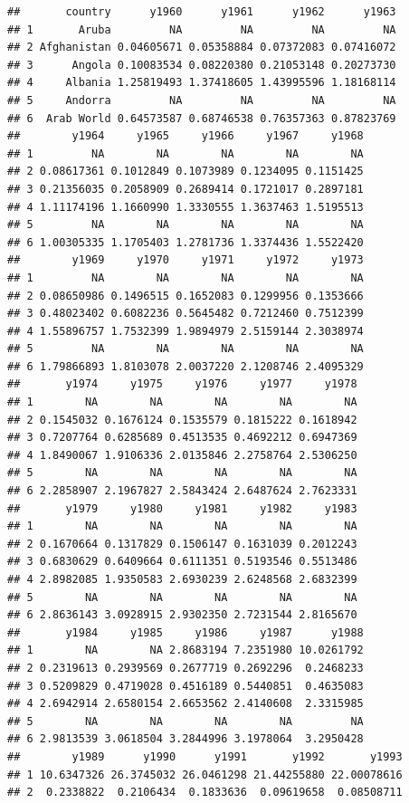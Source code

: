 \documentclass[
]{book}
\begin{document}
\begin{verbatim}
##       country      y1960      y1961      y1962      y1963
## 1       Aruba         NA         NA         NA         NA
## 2 Afghanistan 0.04605671 0.05358884 0.07372083 0.07416072
## 3      Angola 0.10083534 0.08220380 0.21053148 0.20273730
## 4     Albania 1.25819493 1.37418605 1.43995596 1.18168114
## 5     Andorra         NA         NA         NA         NA
## 6  Arab World 0.64573587 0.68746538 0.76357363 0.87823769
##        y1964     y1965     y1966     y1967     y1968
## 1         NA        NA        NA        NA        NA
## 2 0.08617361 0.1012849 0.1073989 0.1234095 0.1151425
## 3 0.21356035 0.2058909 0.2689414 0.1721017 0.2897181
## 4 1.11174196 1.1660990 1.3330555 1.3637463 1.5195513
## 5         NA        NA        NA        NA        NA
## 6 1.00305335 1.1705403 1.2781736 1.3374436 1.5522420
##        y1969     y1970     y1971     y1972     y1973
## 1         NA        NA        NA        NA        NA
## 2 0.08650986 0.1496515 0.1652083 0.1299956 0.1353666
## 3 0.48023402 0.6082236 0.5645482 0.7212460 0.7512399
## 4 1.55896757 1.7532399 1.9894979 2.5159144 2.3038974
## 5         NA        NA        NA        NA        NA
## 6 1.79866893 1.8103078 2.0037220 2.1208746 2.4095329
##       y1974     y1975     y1976     y1977     y1978
## 1        NA        NA        NA        NA        NA
## 2 0.1545032 0.1676124 0.1535579 0.1815222 0.1618942
## 3 0.7207764 0.6285689 0.4513535 0.4692212 0.6947369
## 4 1.8490067 1.9106336 2.0135846 2.2758764 2.5306250
## 5        NA        NA        NA        NA        NA
## 6 2.2858907 2.1967827 2.5843424 2.6487624 2.7623331
##       y1979     y1980     y1981     y1982     y1983
## 1        NA        NA        NA        NA        NA
## 2 0.1670664 0.1317829 0.1506147 0.1631039 0.2012243
## 3 0.6830629 0.6409664 0.6111351 0.5193546 0.5513486
## 4 2.8982085 1.9350583 2.6930239 2.6248568 2.6832399
## 5        NA        NA        NA        NA        NA
## 6 2.8636143 3.0928915 2.9302350 2.7231544 2.8165670
##       y1984     y1985     y1986     y1987      y1988
## 1        NA        NA 2.8683194 7.2351980 10.0261792
## 2 0.2319613 0.2939569 0.2677719 0.2692296  0.2468233
## 3 0.5209829 0.4719028 0.4516189 0.5440851  0.4635083
## 4 2.6942914 2.6580154 2.6653562 2.4140608  2.3315985
## 5        NA        NA        NA        NA         NA
## 6 2.9813539 3.0618504 3.2844996 3.1978064  3.2950428
##        y1989      y1990      y1991       y1992       y1993
## 1 10.6347326 26.3745032 26.0461298 21.44255880 22.00078616
## 2  0.2338822  0.2106434  0.1833636  0.09619658  0.08508711

\end{verbatim}
\end{document}
